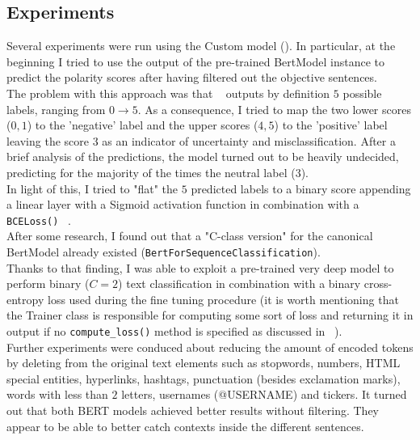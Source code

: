 \subsection{Experiments}
Several experiments were run using the Custom model (). In particular, at the beginning I tried to use the output 
of the pre-trained BertModel instance to predict the polarity scores after having filtered out the objective sentences. \\
The problem with this approach was that ~\cite{model} outputs by definition $5$ possible labels, ranging from $0 \to 5$. As a consequence,
I tried to map the two lower scores ($0,1$) to the 'negative' label and the upper scores ($4,5$) to the 'positive' label leaving the score
$3$ as an indicator of uncertainty and misclassification. After a brief analysis of the predictions, the model turned out to be heavily 
undecided, predicting for the majority of the times the neutral label ($3$).\\
In light of this, I tried to "flat" the $5$ predicted labels to a binary score appending a linear layer with a Sigmoid activation function
in combination with a \texttt{BCELoss()} ~\cite{bce}. \\
After some research, I found out that a "C-class version" for the canonical BertModel already existed (\texttt{BertForSequenceClassification}).\\
Thanks to that finding, I was able to exploit a pre-trained very deep model to perform binary ($C=2$) text classification in combination with a binary cross-entropy
loss used during the fine tuning procedure (it is worth mentioning that the Trainer class is responsible for computing some sort of loss 
and returning it in output if no \texttt{compute\_loss()} method is specified as discussed in ~\cite{stack}). \\
Further experiments were conduced about reducing the amount of encoded tokens by deleting from the original text elements such as stopwords, numbers,
HTML special entities, hyperlinks, hashtags, punctuation (besides exclamation marks), words with less than $2$ letters, usernames 
(@USERNAME) and tickers. It turned out that both BERT models achieved better results without filtering. They appear to be able to better catch 
contexts inside the different sentences.

